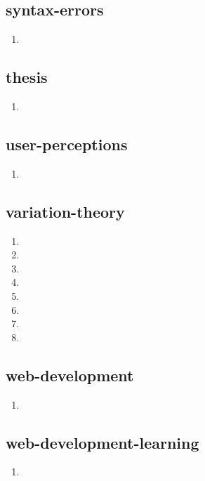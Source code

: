 \documentclass{article}
\begin{document}
\subsection{syntax-errors}
\begin{enumerate}
\item {}
\end{enumerate}

\subsection{thesis}
\begin{enumerate}
\item {}
\end{enumerate}

\subsection{user-perceptions}
\begin{enumerate}
\item {}
\end{enumerate}

\subsection{variation-theory}
\begin{enumerate}
\item {}
\item {}
\item {}
\item {}
\item {}
\item {}
\item {}
\item {}
\end{enumerate}

\subsection{web-development}
\begin{enumerate}
\item {}
\end{enumerate}

\subsection{web-development-learning}
\begin{enumerate}
\item {}
\end{enumerate}
\end{document}
